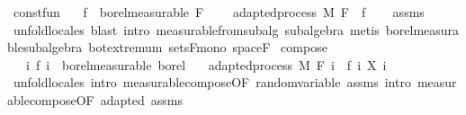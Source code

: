 \begin{isabellebody}
\isanewline
\isanewline
{}\isamarkupfalse%
\ const{\isacharunderscore}{\kern0pt}fun{\isacharcolon}{\kern0pt}\isanewline
\ \ \ {\isachardoublequoteopen}f\ {\isasymin}\ borel{\isacharunderscore}{\kern0pt}measurable\ {\isacharparenleft}{\kern0pt}F\ {\isasymbottom}{\isacharparenright}{\kern0pt}{\isachardoublequoteclose}\isanewline
\ \ \ {\isachardoublequoteopen}adapted{\isacharunderscore}{\kern0pt}process\ M\ F\ {\isacharparenleft}{\kern0pt}{\isasymlambda}{\isacharunderscore}{\kern0pt}{\isachardot}{\kern0pt}\ f{\isacharparenright}{\kern0pt}{\isachardoublequoteclose}\isanewline
%
\isadelimproof
\ \ %
\endisadelimproof
%
\isatagproof
{}\isamarkupfalse%
\ assms\ \isamarkupfalse%
\ {\isacharparenleft}{\kern0pt}unfold{\isacharunderscore}{\kern0pt}locales{\isacharparenright}{\kern0pt}\ {\isacharparenleft}{\kern0pt}blast\ intro{\isacharcolon}{\kern0pt}\ measurable{\isacharunderscore}{\kern0pt}from{\isacharunderscore}{\kern0pt}subalg\ subalgebra{\isacharcomma}{\kern0pt}\ metis\ borel{\isacharunderscore}{\kern0pt}measurable{\isacharunderscore}{\kern0pt}subalgebra\ bot{\isachardot}{\kern0pt}extremum\ sets{\isacharunderscore}{\kern0pt}F{\isacharunderscore}{\kern0pt}mono\ space{\isacharunderscore}{\kern0pt}F{\isacharparenright}{\kern0pt}%
\endisatagproof
{\isafoldproof}%
%
\isadelimproof
\isanewline
%
\endisadelimproof
\isanewline
{}\isamarkupfalse%
\ compose{\isacharcolon}{\kern0pt}\isanewline
\ \ \ {\isachardoublequoteopen}{\isasymAnd}i{\isachardot}{\kern0pt}\ f\ i\ {\isasymin}\ borel{\isacharunderscore}{\kern0pt}measurable\ borel{\isachardoublequoteclose}\isanewline
\ \ \ {\isachardoublequoteopen}adapted{\isacharunderscore}{\kern0pt}process\ M\ F\ {\isacharparenleft}{\kern0pt}{\isasymlambda}i\ {\isasymxi}{\isachardot}{\kern0pt}\ {\isacharparenleft}{\kern0pt}f\ i{\isacharparenright}{\kern0pt}\ {\isacharparenleft}{\kern0pt}X\ i\ {\isasymxi}{\isacharparenright}{\kern0pt}{\isacharparenright}{\kern0pt}{\isachardoublequoteclose}\isanewline
%
\isadelimproof
\ \ %
\endisadelimproof
%
\isatagproof
{}\isamarkupfalse%
\ {\isacharparenleft}{\kern0pt}unfold{\isacharunderscore}{\kern0pt}locales{\isacharcomma}{\kern0pt}\ intro\ measurable{\isacharunderscore}{\kern0pt}compose{\isacharbrackleft}{\kern0pt}OF\ random{\isacharunderscore}{\kern0pt}variable\ assms{\isacharbrackright}{\kern0pt}{\isacharcomma}{\kern0pt}\ intro\ measurable{\isacharunderscore}{\kern0pt}compose{\isacharbrackleft}{\kern0pt}OF\ adapted\ assms{\isacharbrackright}{\kern0pt}{\isacharparenright}{\kern0pt}%

\end{isabellebody}
